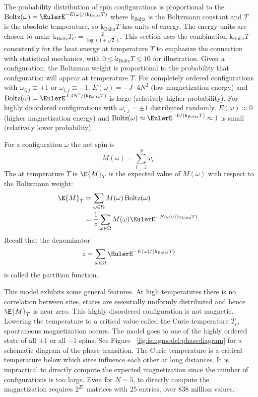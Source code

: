 \documentclass[12pt]{article}
\begin{document}
The probability distribution of spin configurations is proportional to
the %
\(
\operatorname{Boltz}
(\omega) = \EulerE^{-E(\omega)/(\text{k}_{\text{Boltz}} T)} \) where \(
\text{k}_{\text{Boltz}} \) is the Boltzmann constant and \( T \) is the
absolute temperature, so \( \text{k}_{\text{Boltz}} T \) has units of
energy.  The energy units are chosen to make \( \text{k}_{\text{Boltz}}
T_C = \frac{2}{\log(1 + \sqrt{2})} \).  This section uses the
combination \( \text{k}_{\text{Boltz}} T \) consistently for the heat
energy at temperature \( T \) to emphasize the connection with
statistical mechanics, with \( 0 \le \text{k}_{\text{Boltz}} T \le 10 \)
for illustration. Given a configuration, the Boltzman weight is
proportional to the probability that configuration will appear at
temperature \( T \).  For completely ordered configurations with \(
\omega_{i,j} \equiv +1 \) or \( \omega_{i,j} \equiv -1 \), \( E(\omega)
= -J \cdot 4N^2 \) (low magnetization energy) and \(
\operatorname{Boltz}
(\omega) = \EulerE^{J \cdot 4N^2/(\text{k}_{\text{Boltz}} T)} \) is
large (relatively higher probability).  For highly disordered
configurations with \( \omega_{i,j} = \pm 1 \) distributed randomly, \(
E(\omega) \approx 0 \) (higher magnetization energy) and \(
\operatorname{Boltz}
(\omega) \approx \EulerE^{-0/(\text{k}_{\text{Boltz}} T)} \approx 1 \)
is small (relatively lower probability).

For a configuration \( \omega \) the net spin is
\[
    M(\omega) = \sum\limits_{i=1}^N \omega_{i}.
\] The %
at temperature \( T \) is \( \E{M}_T \) is the expected value of \( M(\omega)
\) with respect to the Boltzmann weight:
\begin{align*}
    \E{M}_T &= \sum\limits_{\omega \in \Omega} M(\omega)
    \operatorname{Boltz}
    (\omega) \\
    &= \frac{1}{z} \sum\limits_{\omega \in \Omega} M(\omega) \EulerE^{-E
    (\omega)/(\text{k}_{\text{Boltz}} T)}.
\end{align*}
Recall that the denominator
\[
  z = \sum\limits_{\omega \in \Omega}
           \EulerE^{-E(\omega)/(\text{k}_{\text{Boltz}} T)}
\] is called the partition function.%

This model exhibits some general features.  At high temperatures there
is no correlation between sites, states are essentially uniformly
distributed and hence \( \E{M}_T \) is near zero.  This highly
disordered configuration is not magnetic.  Lowering the temperature to a
critical value called the Curie temperature \( T_c \), spontaneous
magnetization occurs.  The model goes to one of the highly ordered state
of all \( +1 \) or all \( -1 \) spins.  See Figure~%
\ref{fig:isingmodel:phasediagram} for a schematic diagram of the phase
transition.  The Curie temperature is a critical temperature below which
sites influence each other at long distances.  It is impractical to
directly compute the expected magnetization since the number of
configurations is too large.  Even for \( N=5 \), to directly compute
the magnetization requires \( 2^{25} \) matrices with \( 25 \) entries,
over \( 838 \) million values.
\end{document}
